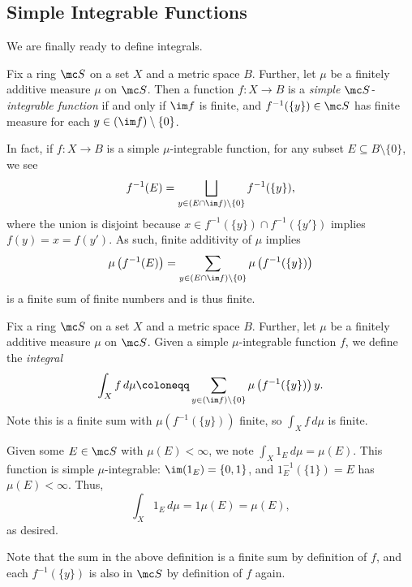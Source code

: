 \documentclass[../notes.tex]{subfiles}
\begin{document}
\subsection{Simple Integrable Functions}
We are finally ready to define integrals.
\begin{definition}
	Fix a ring $\mc S$ on a set $X$ and a metric space $B$. Further, let $\mu$ be a finitely additive measure $\mu$ on $\mc S$. Then a function $f\colon X\to B$ is a \textit{simple $\mc S$-integrable function} if and only if $\im f$ is finite, and $f^{-1}(\{y\})\in\mc S$ has finite measure for each $y\in(\im f)\setminus\{0\}$.
\end{definition}
\begin{remark} \label{rem:better-simp-int}
	In fact, if $f\colon X\to B$ is a simple $\mu$-integrable function, for any subset $E\subseteq B\setminus\{0\}$, we see
	\[f^{-1}(E)=\bigsqcup_{y\in(E\cap\im f)\setminus\{0\}}f^{-1}(\{y\}),\]
	where the union is disjoint because $x\in f^{-1}(\{y\})\cap f^{-1}(\{y'\})$ implies $f(y)=x=f(y')$. As such, finite additivity of $\mu$ implies
	\[\mu\left(f^{-1}(E)\right)=\sum_{y\in(E\cap\im f)\setminus\{0\}}\mu\left(f^{-1}(\{y\})\right)\]
	is a finite sum of finite numbers and is thus finite.
\end{remark}
\begin{definition}[Integral]
	Fix a ring $\mc S$ on a set $X$ and a metric space $B$. Further, let $\mu$ be a finitely additive measure $\mu$ on $\mc S$. Given a simple $\mu$-integrable function $f$, we define the \textit{integral}
	\[\int_Xf\,d\mu\coloneqq\sum_{y\in(\im f)\setminus\{0\}}\mu\left(f^{-1}(\{y\})\right)y.\]
	Note this is a finite sum with $\mu\left(f^{-1}(\{y\})\right)$ finite, so $\int_Xf\,d\mu$ is finite.
\end{definition}
\begin{example} \label{ex:integrate-indicator}
	Given some $E\in\mc S$ with $\mu(E)<\infty$, we note $\int_X1_E\,d\mu=\mu(E)$. This function is simple $\mu$-integrable: $\im(1_E)=\{0,1\}$, and $1_E^{-1}(\{1\})=E$ has $\mu(E)<\infty$. Thus,
	\[\int_X1_E\,d\mu=1\mu(E)=\mu(E),\]
	as desired.
\end{example}
Note that the sum in the above definition is a finite sum by definition of $f$, and each $f^{-1}(\{y\})$ is also in $\mc S$ by definition of $f$ again.
\end{document}
